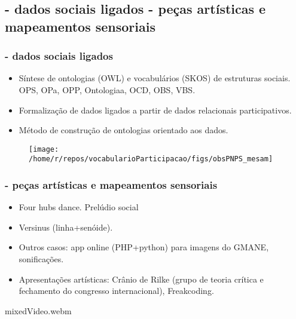 \documentclass[10pt]{beamer}
\begin{document}
\begin{frame}
\subsection{- dados sociais ligados \;\; - peças artísticas e mapeamentos sensoriais}
\frametitle{- dados sociais ligados}
\begin{itemize}
	\item Síntese de ontologias (OWL) e vocabulários (SKOS) de estruturas sociais. OPS, OPa, OPP, Ontologiaa, OCD, OBS, VBS.
	\item Formalização de dados ligados a partir de dados relacionais participativos.
	\item Método de construção de ontologias orientado aos dados.
\end{itemize}

\begin{figure}[h!]
    \centering
    \texttt{[image: /home/r/repos/vocabularioParticipacao/figs/obsPNPS\_mesam]}
\end{figure}


\end{frame}

\begin{frame}
\frametitle{- peças artísticas e mapeamentos sensoriais}
\begin{itemize}
	\item Four hubs dance. Prelúdio social
	\item Versinus (linha+senóide).
	\item Outros casos: app online (PHP+python) para imagens do GMANE, sonificações.
	\item Apresentações artísticas: Crânio de Rilke (grupo de teoria crítica e fechamento do congresso internacional), Freakcoding.
\end{itemize}

\begin{center}
%
{mixedVideo.webm} %
\end{center}

\end{frame}
\end{document}
